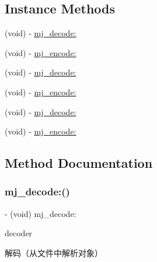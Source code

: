 \subsection*{Instance Methods}
\begin{DoxyCompactItemize}
\item 
(void) -\/ \mbox{\hyperlink{category_n_s_object_07_m_j_coding_08_aac6394dd6ec3b0e4c5f29a9f35a79c61}{mj\+\_\+decode\+:}}
\item 
(void) -\/ \mbox{\hyperlink{category_n_s_object_07_m_j_coding_08_a985b5ac8485573cbe6cedb1a41127e38}{mj\+\_\+encode\+:}}
\item 
(void) -\/ \mbox{\hyperlink{category_n_s_object_07_m_j_coding_08_aac6394dd6ec3b0e4c5f29a9f35a79c61}{mj\+\_\+decode\+:}}
\item 
(void) -\/ \mbox{\hyperlink{category_n_s_object_07_m_j_coding_08_a985b5ac8485573cbe6cedb1a41127e38}{mj\+\_\+encode\+:}}
\item 
(void) -\/ \mbox{\hyperlink{category_n_s_object_07_m_j_coding_08_aac6394dd6ec3b0e4c5f29a9f35a79c61}{mj\+\_\+decode\+:}}
\item 
(void) -\/ \mbox{\hyperlink{category_n_s_object_07_m_j_coding_08_a985b5ac8485573cbe6cedb1a41127e38}{mj\+\_\+encode\+:}}
\end{DoxyCompactItemize}


\subsection{Method Documentation}
\mbox{\label{category_n_s_object_07_m_j_coding_08_aac6394dd6ec3b0e4c5f29a9f35a79c61}} 
\subsubsection{\texorpdfstring{mj\+\_\+decode\+:()}{mj\_decode:()}\hspace{0.1cm}{\footnotesize\ttfamily [1/3]}}
{\footnotesize\ttfamily -\/ (void) mj\+\_\+decode\+: \begin{DoxyParamCaption}\item[{(N\+S\+Coder $\ast$)}]{decoder }\end{DoxyParamCaption}}

解码（从文件中解析对象） \mbox{\label{category_n_s_object_07_m_j_coding_08_aac6394dd6ec3b0e4c5f29a9f35a79c61}} 
